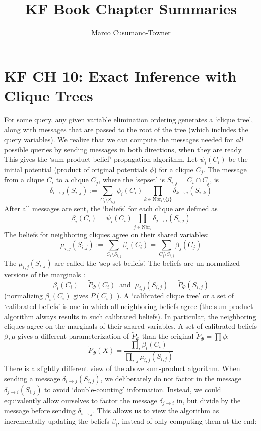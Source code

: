 \documentclass[11pt]{article}
\title{KF Book Chapter Summaries}
\author{Marco Cusumano-Towner}
\begin{document}
\maketitle

\section*{KF CH 10: Exact Inference with Clique Trees}
For some query, any given variable elimination ordering generates a `clique tree', along with messages that are passed to the root of the tree (which includes the query variables). We realize that we can compute the messages needed for \emph{all} possible queries by sending messages in both directions, when they are ready. This gives the `sum-product belief' propagation algorithm. Let $\psi_i(C_i)$ be the initial potential (product of original potentials $\phi$) for a clique $C_j$. The message from a clique $C_i$ to a clique $C_j$, where the `sepset' is $S_{i,j} = C_i \cap C_j$, is 
\[ \delta_{i \to j}(S_{i,j}) := \sum_{C_i \setminus S_{i,j}} \psi_i(C_i) \prod_{k \in \mbox{Nbr}_i \setminus \{j\} } \delta_{k \to i}(S_{i,k})\]
After all messages are sent, the `beliefs' for each clique are defined as
\[ \beta_{i}(C_i) = \psi_{i}(C_i) \prod_{j \in \mbox{Nbr}_i } \delta_{j \to i}(S_{i,j})\]
The beliefs for neighboring cliques agree on their shared variables:
\[ \mu_{i,j}(S_{i,j}) := \sum_{C_i \setminus S_{i,j}} \beta_{i}(C_i) = \sum_{C_j \setminus S_{i,j}} \beta_{j}(C_j) \]
The $\mu_{i,j}(S_{i,j})$ are called the `sep-set beliefs'. The beliefs are un-normalized versions of the marginals :
\[ \beta_{i}(C_i) = \tilde{P}_\Phi(C_i) \;\;\mbox{and}\;\; \mu_{i,j}(S_{i,j}) = \tilde{P}_\Phi(S_{i,j}) \]
(normalizing $\beta_i(C_i)$ gives $P(C_i)$ ). A `calibrated clique tree' or a set of `calibrated beliefs' is one in which all neighboring beliefs agree (the sum-product algorithm always results in such calibrated beliefs). In particular, the neighboring cliques agree on the marginals of their shared variables. A set of calibrated beliefs $\beta, \mu$ gives a different parameterization of $\tilde{P}_\Phi$ than the original $\tilde{P}_\Phi = \prod \phi$:
\[ \tilde{P}_\Phi(X) = \frac{\prod_i \beta_i(C_i) }{\prod_{i,j} \mu_{i,j}(S_{i,j})} \]
There is a slightly different view of the above sum-product algorithm. When sending a message $\delta_{i \to j}(S_{i,j})$, we deliberately do not factor in the message $\delta_{j \to i}(S_{i,j})$ to avoid `double-counting' information. Instead, we could equivalently allow ourselves to factor the message $\delta_{j \to i}$ in, but divide by the message before sending $\delta_{i \to j}$. This allows us to view the algorithm as incrementally updating the beliefs $\beta_i$, instead of only computing them at the end:
\end{document}
